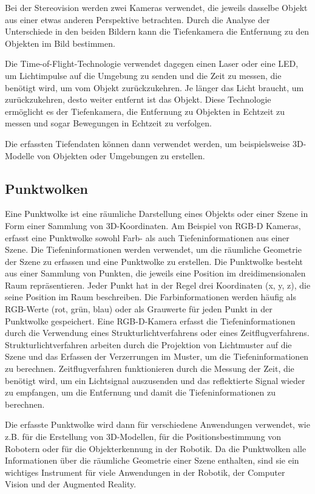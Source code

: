Bei der Stereovision werden zwei Kameras verwendet, die jeweils dasselbe Objekt aus einer etwas anderen Perspektive betrachten. Durch die Analyse der Unterschiede in den beiden Bildern kann die Tiefenkamera die Entfernung zu den Objekten im Bild bestimmen.

Die Time-of-Flight-Technologie verwendet dagegen einen Laser oder eine LED, um Lichtimpulse auf die Umgebung zu senden und die Zeit zu messen, die benötigt wird, um vom Objekt zurückzukehren. Je länger das Licht braucht, um zurückzukehren, desto weiter entfernt ist das Objekt. Diese Technologie ermöglicht es der Tiefenkamera, die Entfernung zu Objekten in Echtzeit zu messen und sogar Bewegungen in Echtzeit zu verfolgen.

Die erfassten Tiefendaten können dann verwendet werden, um beispielsweise 3D-Modelle von Objekten oder Umgebungen zu erstellen.

\subsection{Punktwolken}
Eine Punktwolke ist eine räumliche Darstellung eines Objekts oder einer Szene in Form einer Sammlung von 3D-Koordinaten. Am Beispiel von \ac{RGB-D} Kameras, erfasst eine Punktwolke sowohl Farb- als auch Tiefeninformationen aus einer Szene.
Die Tiefeninformationen werden verwendet, um die räumliche Geometrie der Szene zu erfassen und eine Punktwolke zu erstellen.
Die Punktwolke besteht aus einer Sammlung von Punkten, die jeweils eine Position im dreidimensionalen Raum repräsentieren. Jeder Punkt hat in der Regel drei Koordinaten (x, y, z), die seine Position im Raum beschreiben. Die Farbinformationen werden häufig als RGB-Werte (rot, grün, blau) oder als Grauwerte für jeden Punkt in der Punktwolke gespeichert.
Eine \ac{RGB-D}-Kamera erfasst die Tiefeninformationen durch die Verwendung eines Strukturlichtverfahrens oder eines Zeitflugverfahrens. Strukturlichtverfahren arbeiten durch die Projektion von Lichtmuster auf die Szene und das Erfassen der Verzerrungen im Muster, um die Tiefeninformationen zu berechnen. Zeitflugverfahren funktionieren durch die Messung der Zeit, die benötigt wird, um ein Lichtsignal auszusenden und das reflektierte Signal wieder zu empfangen, um die Entfernung und damit die Tiefeninformationen zu berechnen.

Die erfasste Punktwolke wird dann für verschiedene Anwendungen verwendet, wie z.B. für die Erstellung von 3D-Modellen, für die Positionsbestimmung von Robotern oder für die Objekterkennung in der Robotik. Da die Punktwolken alle Informationen über die räumliche Geometrie einer Szene enthalten, sind sie ein wichtiges Instrument für viele Anwendungen in der Robotik, der Computer Vision und der Augmented Reality.


